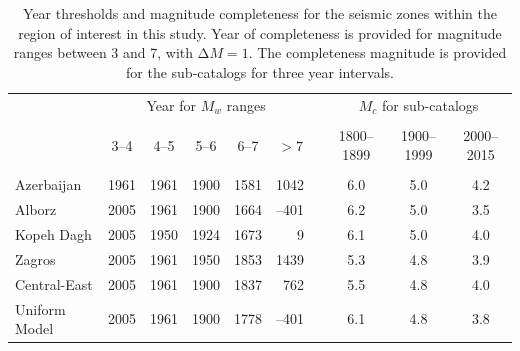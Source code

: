\begin{table}%
    \centering
    \caption{Year thresholds and magnitude completeness for the seismic zones within the region of interest in this study. Year of completeness is provided for magnitude ranges between 3 and 7, with $\mathrm{\Delta}M = 1$. The completeness magnitude is provided for the sub-catalogs for three year intervals.}
    \begin{tabular}{lccccrcccc}
        \cline{2-10}                                                                                  \\[-1.6ex]
                        & \multicolumn{5}{c}{Year for $M_w$ ranges} 
                                                            & & \multicolumn{3}{c}{$M_c$ for sub-catalogs} \\
        \cline{2-6} \cline{8-10}                                                                      \\[-1.6ex]
                        & 3--4 & 4--5 & 5--6 & 6--7 & \multicolumn{1}{c}{$>7$} 
                                                            & & 1800--1899 & 1900--1999 & 2000--2015  \\[0.6ex]
        \hline                                                                                        \\[-1.6ex]
        Azerbaijan      & 1961 & 1961 & 1900 & 1581 & 1042  & &     6.0    &     5.0    &     4.2     \\
        Alborz          & 2005 & 1961 & 1900 & 1664 &--401  & &     6.2    &     5.0    &     3.5     \\
        Kopeh Dagh      & 2005 & 1950 & 1924 & 1673 &    9  & &     6.1    &     5.0    &     4.0     \\
        Zagros          & 2005 & 1961 & 1950 & 1853 & 1439  & &     5.3    &     4.8    &     3.9     \\
        Central-East    & 2005 & 1961 & 1900 & 1837 &  762  & &     5.5    &     4.8    &     4.0     \\
        Uniform Model   & 2005 & 1961 & 1900 & 1778 &--401  & &     6.1    &     4.8    &     3.8     \\[0.5ex]
        \hline 
    \end{tabular}
    \label{tab:completeness} 
\end{table}



